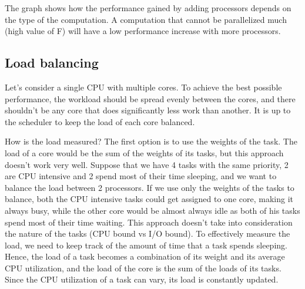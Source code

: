 \label{fig:plot_cpu}

The graph shows how the performance gained by adding processors depends on the type of the computation. A computation that cannot be parallelized much (high value of F) will have a low performance increase with more processors. 

\subsection{Load balancing}

Let's consider a single CPU with multiple cores. To achieve the best possible performance, the workload should be spread evenly between the cores, and there shouldn't be any core that does significantly less work than another. It is up to the scheduler to keep the load of each core balanced.

How is the load measured? The first option is to use the weights of the task. The load of a core would be the sum of the weights of its tasks, but this approach doesn't work very well. Suppose that we have 4 tasks with the same priority, 2 are CPU intensive and 2 spend most of their time sleeping, and we want to balance the load between 2 processors. If we use only the weights of the tasks to balance, both the CPU intensive tasks could get assigned to one core, making it always busy, while the other core would be almost always idle as both of his tasks spend most of their time waiting. This approach doesn't take into consideration the nature of the tasks (CPU bound vs I/O bound). To effectively measure the load, we need to keep track of the amount of time that a task spends sleeping. Hence, the load of a task becomes a combination of its weight and its average CPU utilization, and the load of the core is the sum of the loads of its tasks. Since the CPU utilization of a task can vary, its load is constantly updated.

